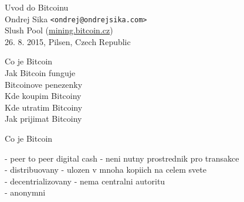 \documentclass{beamer}
\begin{document}
\begin{frame}

    {\LARGE Uvod do Bitcoinu}\\
    \vspace{7mm}
    {\Large Ondrej Sika \lstinline|<ondrej@ondrejsika.com>|}\\
    \vspace{7mm}
    {\large Slush Pool (\url{mining.bitcoin.cz})}\\
    \vspace{7mm}
    26. 8. 2015, Pilsen, Czech Republic\\

\end{frame}

\begin{frame}

    {\LARGE Co je Bitcoin}\\
    \vspace{5mm}
    {\LARGE Jak Bitcoin funguje}\\
    \vspace{5mm}
    {\LARGE Bitcoinove penezenky}\\
    \vspace{5mm}
    {\LARGE Kde koupim Bitcoiny}\\
    \vspace{5mm}
    {\LARGE Kde utratim Bitcoiny}\\
    \vspace{5mm}
    {\LARGE Jak prijimat Bitcoiny}\\

\end{frame}

\begin{frame}

    {\LARGE Co je Bitcoin}\\

    \vspace{5mm}

    - peer to peer digital cash - neni nutny prostrednik pro transakce\\
    - distribuovany - ulozen v mnoha kopiich na celem svete\\
    - decentrializovany - nema centralni autoritu\\
    - anonymni\\

\end{frame}
\end{document}
